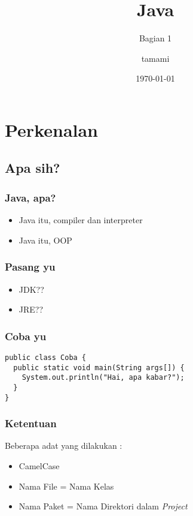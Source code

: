 \documentclass{beamer}
\title{Java}
\subtitle{Bagian 1}
\author{tamami}
\institute{BPPKAD Kab. Brebes}
\date{\today}
\begin{document}
\begin{frame}
\titlepage
\end{frame}

\section{Perkenalan}
\subsection{Apa sih?}


\begin{frame}
\frametitle{Java, apa?}

\begin{itemize}
	\item Java itu, compiler dan interpreter
	\item Java itu, OOP
\end{itemize}
\end{frame}



\begin{frame}
\frametitle{Pasang yu}

\begin{itemize}
	\item JDK??
	\item JRE??
\end{itemize}
\end{frame}



\begin{frame}[fragile]
\frametitle{Coba yu}
\begin{lstlisting}
public class Coba {
  public static void main(String args[]) {
    System.out.println("Hai, apa kabar?");
  }
}
\end{lstlisting}
\end{frame}



\begin{frame}
\frametitle{Ketentuan}
Beberapa adat yang dilakukan :

\begin{itemize}
	\item CamelCase
	\item Nama File = Nama Kelas
	\item Nama Paket = Nama Direktori dalam \textit{Project}
\end{itemize}

\end{frame}
\end{document}
